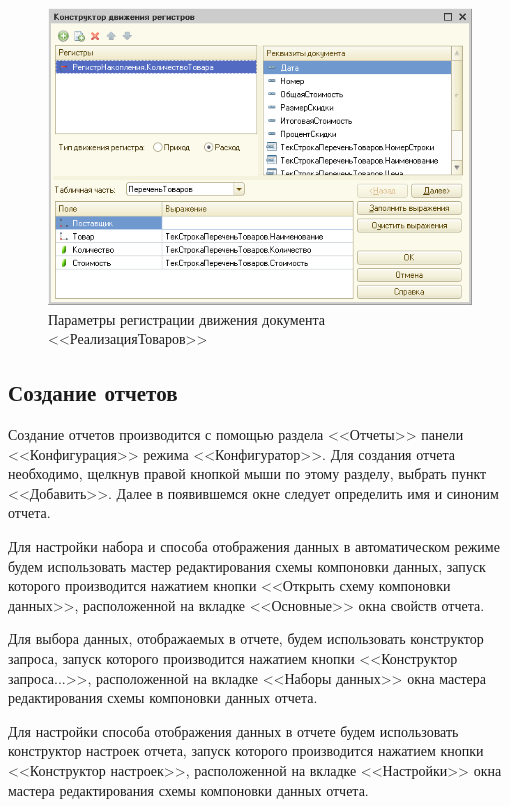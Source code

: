 \begin{figure}[h!]
  \centering
  \includegraphics[width=130mm]{pic/reg_doc_output}
  \caption{Параметры регистрации движения документа <<РеализацияТоваров>>}
  \label{fig:reg_doc_output}
\end{figure}

\pagebreak

\subsection{Создание отчетов}

Создание отчетов производится с помощью раздела
<<Отчеты>> панели <<Конфигурация>> режима <<Конфигуратор>>.
Для создания отчета необходимо,
щелкнув правой кнопкой мыши по этому
разделу, выбрать пункт <<Добавить>>. Далее в появившемся окне
следует определить имя и синоним отчета.

Для настройки набора и способа отображения данных в
автоматическом режиме будем использовать
мастер редактирования схемы компоновки данных,
запуск которого производится нажатием кнопки
<<Открыть схему компоновки данных>>, расположенной
на вкладке <<Основные>> окна свойств отчета.

Для выбора данных, отображаемых в отчете, будем использовать
конструктор запроса, запуск которого производится нажатием кнопки
<<Конструктор запроса...>>, расположенной
на вкладке <<Наборы данных>> окна
мастера редактирования схемы компоновки данных отчета.

Для настройки способа отображения данных в отчете будем использовать
конструктор настроек отчета, запуск которого производится нажатием кнопки
<<Конструктор настроек>>, расположенной
на вкладке <<Настройки>> окна
мастера редактирования схемы компоновки данных отчета.

